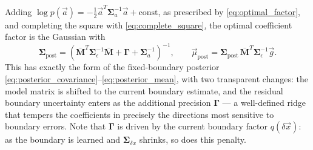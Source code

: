 \documentclass{article}
\begin{document}
Adding $\log p(\vec a) = -\frac12 \vec a^T\mathbf{\Sigma}_a^{-1}\vec a + \text{const}$, as prescribed by \eqref{eq:optimal_factor}, and completing the square with \eqref{eq:complete_square}, the optimal coefficient factor is the Gaussian with
\begin{equation}
    \mathbf{\Sigma}_{\text{post}}=\left(\bar{\mathbf{M}}^T\mathbf{\Sigma}_\epsilon^{-1}\bar{\mathbf{M}}+\mathbf{\Gamma}+\mathbf{\Sigma}_a^{-1}\right)^{-1},\qquad
    \vec{\mu}_{\text{post}}=\mathbf{\Sigma}_{\text{post}}\,\bar{\mathbf{M}}^T\mathbf{\Sigma}_\epsilon^{-1}\vec{g}. \label{eq:vb_coefficient_update}
\end{equation}
This has exactly the form of the fixed-boundary posterior \eqref{eq:posterior_covariance}--\eqref{eq:posterior_mean}, with two transparent changes: the model matrix is shifted to the current boundary estimate, and the residual boundary uncertainty enters as the additional precision $\mathbf\Gamma$ --- a well-defined ridge that tempers the coefficients in precisely the directions most sensitive to boundary errors. Note that $\mathbf\Gamma$ is driven by the current boundary factor $q(\delta\vec x)$: as the boundary is learned and $\mathbf{\Sigma}_{\delta x}$ shrinks, so does this penalty.
\end{document}
